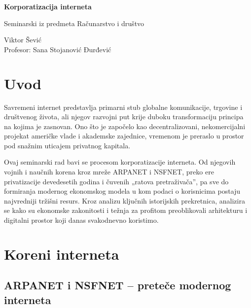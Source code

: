 \documentclass[12pt,a4paper]{article}
\begin{document}
\begin{titlepage}
    \centering

    \vspace*{3cm}

    {\LARGE\textbf{Korporatizacija interneta}\par}
    
    \vspace{0.5cm}
    
    {\large Seminarski iz predmeta Računarstvo i društvo\par}

    \vfill

    {\large
    Viktor Šević\\[0.2cm]
    Profesor: Sana Stojanović Đurđević
    \par}

\end{titlepage}

\newpage

\section{Uvod}

Savremeni internet predstavlja primarni stub globalne komunikacije, trgovine i društvenog života, ali njegov razvojni put krije duboku transformaciju principa na kojima je zasnovan. Ono što je započelo kao decentralizovani, nekomercijalni projekat američke vlade i akademske zajednice, vremenom je preraslo u prostor pod snažnim uticajem privatnog kapitala. 

Ovaj seminarski rad bavi se procesom korporatizacije interneta. Od njegovih vojnih i naučnih korena kroz mreže ARPANET i NSFNET, preko ere privatizacije devedesetih godina i čuvenih „ratova pretraživača”, pa sve do formiranja modernog ekonomskog modela u kom podaci o korisnicima postaju najvredniji tržišni resurs. Kroz analizu ključnih istorijskih prekretnica, analizira se kako su ekonomske zakonitosti i težnja za profitom preoblikovali arhitekturu i digitalni prostor koji danas svakodnevno koristimo.

\section{Koreni interneta}
\subsection{\textbf{ARPANET i NSFNET – preteče modernog interneta}}
\end{document}
